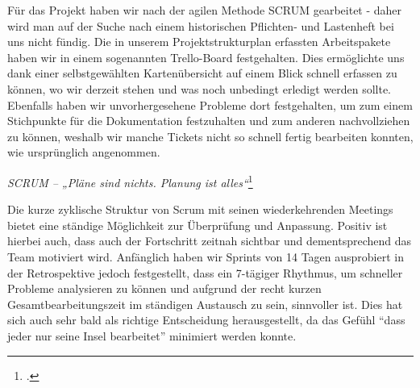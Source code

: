 
Für das Projekt haben wir nach der agilen Methode SCRUM gearbeitet - daher wird man auf der Suche nach einem historischen Pflichten- und Lastenheft bei uns nicht fündig. Die in unserem Projektstrukturplan erfassten Arbeitspakete haben wir in einem sogenannten Trello-Board festgehalten. Dies ermöglichte uns dank einer selbstgewählten Kartenübersicht auf einem Blick schnell erfassen zu können, wo wir derzeit stehen und was noch unbedingt erledigt werden sollte. Ebenfalls haben wir unvorhergesehene Probleme dort festgehalten, um zum einem Stichpunkte für die Dokumentation festzuhalten und zum anderen nachvollziehen zu  können, weshalb wir manche Tickets  nicht so schnell fertig bearbeiten konnten, wie ursprünglich angenommen. 
\begin{center}
	\textit{SCRUM – „Pläne sind nichts. Planung ist alles“}\footcite{RolfDraehter2019}
\end{center}
Die kurze zyklische Struktur von Scrum mit seinen wiederkehrenden Meetings bietet eine ständige Möglichkeit zur Überprüfung und Anpassung. Positiv ist hierbei auch, dass auch der Fortschritt zeitnah sichtbar und dementsprechend das Team motiviert wird. Anfänglich haben wir Sprints von 14 Tagen ausprobiert in der Retrospektive jedoch festgestellt, dass ein  7-tägiger Rhythmus, um schneller Probleme analysieren zu können und aufgrund der recht kurzen Gesamtbearbeitungszeit im ständigen Austausch zu sein, sinnvoller ist. Dies hat sich auch sehr bald als richtige Entscheidung herausgestellt, da das Gefühl “dass jeder nur seine Insel bearbeitet” minimiert werden konnte.

